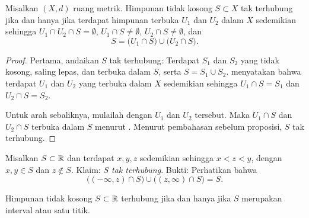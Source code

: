 \begin{prop}
Misalkan $(X,d)$ ruang metrik.
Himpunan tidak kosong $S \subset X$ tak terhubung jika dan hanya jika
terdapat himpunan terbuka $U_1$ dan
$U_2$ dalam $X$ sedemikian sehingga $U_1 \cap U_2 \cap S = \emptyset$,
$U_1 \cap S \neq \emptyset$,
$U_2 \cap S \neq \emptyset$, dan
\begin{equation*}
S = 
\bigl( U_1 \cap S \bigr)
\cup
\bigl( U_2 \cap S \bigr) .
\end{equation*}
\end{prop}

\begin{myfigureht}
\caption{Himpunan bagian tak terhubung.  Perhatikan bahwa $U_1 \cap U_2$ tidak harus
kosong, tetapi $U_1 \cap U_2 \cap S = \emptyset$.\label{fig:disconsubset}}
\end{myfigureht}


\begin{proof}
Pertama, andaikan $S$ tak terhubung: Terdapat
$S_1$ dan $S_2$ yang tidak kosong, saling lepas, dan
terbuka dalam $S$, serta $S = S_1 \cup S_2$.
 menyatakan bahwa terdapat $U_1$ dan $U_2$
yang terbuka dalam $X$ sedemikian sehingga $U_1 \cap S = S_1$ dan
$U_2 \cap S = S_2$.

Untuk arah sebaliknya, mulailah dengan $U_1$ dan $U_2$ tersebut.
Maka $U_1 \cap S$ dan $U_2 \cap S$ terbuka dalam $S$ menurut
.
Menurut pembahasan sebelum proposisi, $S$ tak terhubung.
\end{proof}

\begin{example}
Misalkan $S \subset {\mathbb{R}}$ dan terdapat $x,y,z$ sedemikian sehingga $x < z < y$, dengan $x,y \in S$
dan $z \notin S$.  Klaim: \emph{$S$ tak terhubung}.  Bukti:  Perhatikan bahwa
\begin{equation*}
\bigl( (-\infty,z) \cap S \bigr)
\cup
\bigl( (z,\infty) \cap S \bigr)
= S .
\end{equation*}
\end{example}

\begin{prop}
Himpunan tidak kosong $S \subset {\mathbb{R}}$ terhubung jika dan hanya jika $S$
merupakan interval atau satu titik.
\end{prop}

